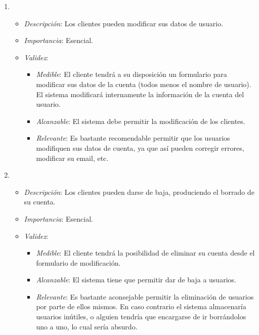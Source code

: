 \begin{enumerate}[{\bf RF-1}]
\item 
  \begin{itemize}
  \item \textit{Descripción}: Los clientes pueden modificar sus datos de usuario.
  \item \textit{Importancia}: Esencial.
  \item \textit{Validez}:
    \begin{itemize}
    \item \textit{Medible}: El cliente tendrá a su disposición un formulario para modificar sus datos de la cuenta (todos menos el nombre de usuario). El sistema modificará internamente la información de la cuenta del usuario.
    \item \textit{Alcanzable}: El sistema debe permitir la modificación de los clientes.
    \item \textit{Relevante}: Es bastante recomendable permitir que los usuarios modifiquen sus datos de cuenta, ya que así pueden corregir errores, modificar su email, etc.
    \end{itemize}
  \end{itemize}

\item 
  \begin{itemize}
  \item \textit{Descripción}: Los clientes pueden darse de baja, produciendo el borrado de su cuenta.
  \item \textit{Importancia}: Esencial.
  \item \textit{Validez}:
    \begin{itemize}
    \item \textit{Medible}: El cliente tendrá la posibilidad de eliminar su cuenta desde el formulario de modificación.
    \item \textit{Alcanzable}: El sistema tiene que permitir dar de baja a usuarios.
    \item \textit{Relevante}: Es bastante aconsejable permitir la eliminación de usuarios por parte de ellos mismos. En caso contrario el sistema almacenaría usuarios inútiles, o alguien tendría que encargarse de ir borrándolos uno a uno, lo cual sería absurdo.
    \end{itemize}
  \end{itemize}


\end{enumerate}
